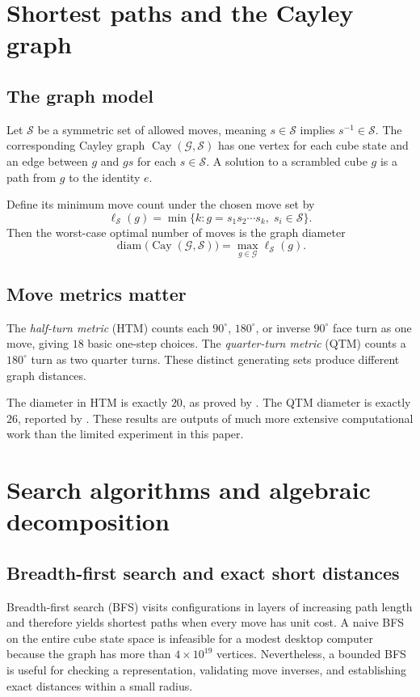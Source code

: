 \documentclass[11pt,a4paper]{article}
\theoremstyle{definition}
\theoremstyle{remark}
\DeclareMathOperator{\diam}{diam}
\newcommand{\G}{\mathcal{G}}
\newcommand{\moves}{\mathcal{S}}
\begin{document}
\section{Shortest paths and the Cayley graph}
\subsection{The graph model}
Let $\moves$ be a symmetric set of allowed moves, meaning $s\in\moves$ implies $s^{-1}\in\moves$. The corresponding Cayley graph $\operatorname{Cay}(\G,\moves)$ has one vertex for each cube state and an edge between $g$ and $gs$ for each $s\in\moves$. A solution to a scrambled cube $g$ is a path from $g$ to the identity $e$.

Define its minimum move count under the chosen move set by
\begin{equation}\label{eq:distance}
\ell_{\moves}(g)=\min\big\{k:g=s_1s_2\cdots s_k,\;s_i\in\moves\big\}.
\end{equation}
Then the worst-case optimal number of moves is the graph diameter
\begin{equation}\label{eq:diameter}
\diam\big(\operatorname{Cay}(\G,\moves)\big)
=\max_{g\in\G}\ell_{\moves}(g).
\end{equation}

\subsection{Move metrics matter}
The \emph{half-turn metric} (HTM) counts each $90^\circ$, $180^\circ$, or inverse $90^\circ$ face turn as one move, giving $18$ basic one-step choices. The \emph{quarter-turn metric} (QTM) counts a $180^\circ$ turn as two quarter turns. These distinct generating sets produce different graph distances.

The diameter in HTM is exactly $20$, as proved by \citet{rokicki2013}. The QTM diameter is exactly $26$, reported by \citet{qtm2014}. These results are outputs of much more extensive computational work than the limited experiment in this paper.

\section{Search algorithms and algebraic decomposition}
\subsection{Breadth-first search and exact short distances}
Breadth-first search (BFS) visits configurations in layers of increasing path length and therefore yields shortest paths when every move has unit cost. A naive BFS on the entire cube state space is infeasible for a modest desktop computer because the graph has more than $4\times10^{19}$ vertices. Nevertheless, a bounded BFS is useful for checking a representation, validating move inverses, and establishing exact distances within a small radius.
\end{document}

